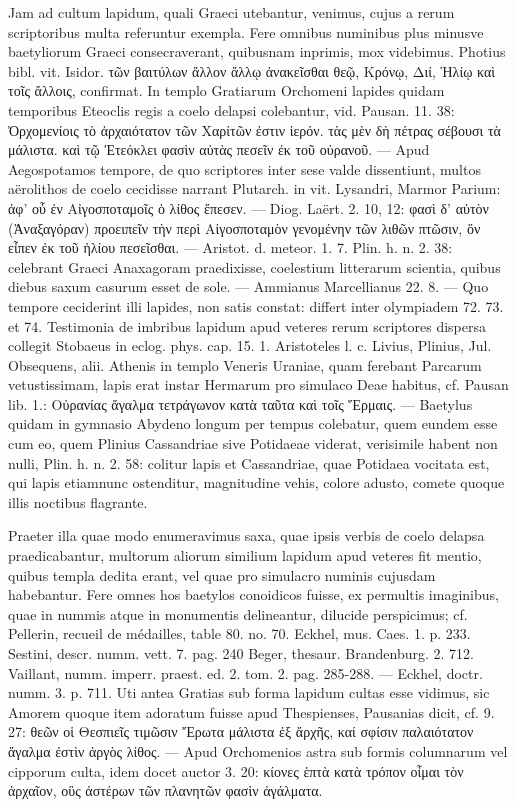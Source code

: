 \documentclass[a4paper, 11pt, oneside, polutonikogreek, german]{article}
\begin{document}
Jam ad cultum lapidum, quali Graeci utebantur, venimus, cujus a rerum scriptoribus multa referuntur exempla. Fere omnibus numinibus plus minusve baetyliorum Graeci consecraverant, quibusnam inprimis, mox videbimus. Photius bibl. vit. Isidor. τῶν βαιτύλων ἄλλον ἄλλῳ ἀνακεῖσθαι θεῷ, Κρόνῳ, Διί, Ἡλίῳ καὶ τοῖς ἄλλοις, confirmat. In templo Gratiarum Orchomeni lapides quidam temporibus Eteoclis regis a coelo delapsi colebantur, vid. Pausan. 11. 38: Ὀρχομενίοις τὸ ἀρχαιότατον τῶν Χαρίτῶν ἐστιν ἱερόν. τὰς μὲν δὴ πέτρας σέβουσι τὰ μάλιστα. καὶ τῷ Ἐτεόκλει φασὶν αὐτὰς πεσεῖν ἐκ τοῦ οὐρανοῦ. --- Apud Aegospotamos tempore, de quo scriptores inter sese valde dissentiunt, multos aërolithos de coelo cecidisse narrant Plutarch. in vit. Lysandri, Marmor Parium: ἀφ' οὗ ἐν Αἰγοσποταμοῖς ὁ λίθος ἔπεσεν. --- Diog. Laërt. 2. 10, 12: φασὶ δ' αὐτὸν (Ἀναξαγόραν) προειπεῖν τὴν περὶ Αἰγοσποταμὸν γενομένην τῶν λιθῶν πτῶσιν, ὅν εἶπεν ἐκ τοῦ ἡλίου πεσεῖσθαι. --- Aristot. d. meteor. 1. 7. Plin. h. n. 2. 38: celebrant Graeci Anaxagoram praedixisse, coelestium litterarum scientia, quibus diebus saxum casurum esset de sole. --- Ammianus Marcellianus 22. 8. --- Quo tempore ceciderint illi lapides, non satis constat: differt inter olympiadem 72. 73. et 74. Testimonia de imbribus lapidum apud veteres rerum scriptores dispersa collegit Stobaeus in eclog. phys. cap. 15. 1. Aristoteles l. c. Livius, Plinius, Jul. Obsequens, alii. Athenis in templo Veneris Uraniae, quam ferebant Parcarum vetustissimam, lapis erat instar Hermarum pro simulaco Deae habitus, cf. Pausan lib. 1.: Οὐρανίας ἄγαλμα τετράγωνον κατὰ ταῦτα καὶ τοῖς Ἕρμαις. --- Baetylus quidam in gymnasio Abydeno longum per tempus colebatur, quem eundem esse cum eo, quem Plinius Cassandriae sive Potidaeae viderat, verisimile habent non nulli, Plin. h. n. 2. 58: colitur lapis et Cassandriae, quae Potidaea vocitata est, qui lapis etiamnunc ostenditur, magnitudine vehis, colore adusto, comete quoque illis noctibus flagrante.

Praeter illa quae modo enumeravimus saxa, quae ipsis verbis de coelo delapsa praedicabantur, multorum aliorum similium lapidum apud veteres fit mentio, quibus templa dedita erant, vel quae pro simulacro numinis cujusdam habebantur. Fere omnes hos baetylos conoidicos fuisse, ex permultis imaginibus, quae in nummis atque in monumentis delineantur, dilucide perspicimus; cf. Pellerin, recueil de médailles, table 80. no. 70. Eckhel, mus. Caes. 1. p. 233. Sestini, descr. numm. vett. 7. pag. 240 Beger, thesaur. Brandenburg. 2. 712. Vaillant, numm. imperr. praest. ed. 2. tom. 2. pag. 285-288. --- Eckhel, doctr. numm. 3. p. 711. Uti antea Gratias sub forma lapidum cultas esse vidimus, sic Amorem quoque item adoratum fuisse apud Thespienses, Pausanias dicit, cf. 9. 27: θεῶν οἱ Θεσπιεῖς τιμῶσιν Ἔρωτα μάλιστα ἐξ ἄρχῆς, καί σφίσιν παλαιότατον ἄγαλμα ἐστὶν ἀργὸς λίθος. --- Apud Orchomenios astra sub formis columnarum vel cipporum culta, idem docet auctor 3. 20: κίονες ἑπτὰ κατὰ τρόπον οἶμαι τὸν ἀρχαῖον, οὓς ἀστέρων τῶν πλανητῶν φασὶν ἀγάλματα.
\end{document}
